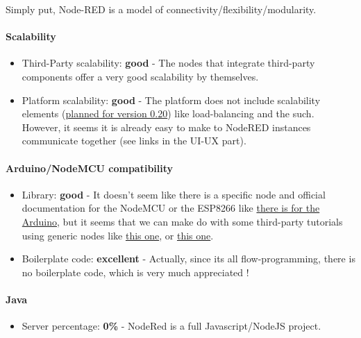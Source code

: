 \documentclass{article}
\begin{document}
Simply put, Node-RED is a model of connectivity/flexibility/modularity.

\paragraph{Scalability}

\begin{itemize}
\item Third-Party scalability: \textbf{good} - The nodes that integrate third-party components offer a very good scalability by themselves.
\item Platform scalability: \textbf{good} - The platform does not include scalability elements (\href{https://nodered.org/blog/2017/07/17/roadmap-to-1-dot-0}{planned for version 0.20}) like load-balancing and the such. However, it seems it is already easy to make to NodeRED instances communicate together (see links in the UI-UX part).
\end{itemize}

\paragraph{Arduino/NodeMCU compatibility}

\begin{itemize}
\item Library: \textbf{good} - It doesn't seem like there is a specific node and official documentation for the NodeMCU or the ESP8266 like \href{https://nodered.org/docs/hardware/arduino}{there is for the Arduino}, but it seems that we can make do with some third-party tutorials using generic nodes like \href{https://www.hackster.io/itchopshop/nodemcu-with-azure-mqtt-and-node-red-ef1f94}{this one}, or \href{http://www.instructables.com/id/Tutorial-ESP8266-and-Node-RED-MQTT-GPIO-Mosquitto-/}{this one}.
\item Boilerplate code: \textbf{excellent} - Actually, since its all flow-programming, there is no boilerplate code, which is very much appreciated !
\end{itemize}

\paragraph{Java}

\begin{itemize}
\item Server percentage: \textbf{0\%} - NodeRed is a full Javascript/NodeJS project.
\end{itemize}
\end{document}
